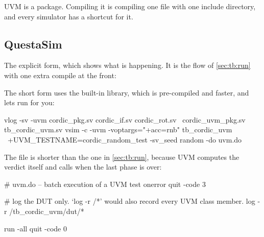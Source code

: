%
UVM is a package. Compiling it is compiling one file with one include
directory, and every simulator has a shortcut for it.

\subsection{QuestaSim}

The explicit form, which shows what is happening. It is the flow of
\cref{sec:tb:run} with one extra compile at the front:


The short form uses the built-in library, which is pre-compiled and faster,
and lets  run  for you:

\begin{shcode}
vlog -sv -uvm cordic_pkg.sv cordic_if.sv cordic_rot.sv \
              cordic_uvm_pkg.sv tb_cordic_uvm.sv
vsim -c -uvm -voptargs="+acc=rnb" tb_cordic_uvm \
     +UVM_TESTNAME=cordic_random_test -sv_seed random -do uvm.do
\end{shcode}

The \code{do} file is shorter than the one in \cref{sec:tb:run}, because UVM
computes the verdict itself and \code{run\_test()} calls  when
the last phase is over:

\begin{tclcode}
# uvm.do -- batch execution of a UVM test
onerror {quit -code 3}

# log the DUT only.  `log -r /*' would also record every UVM class member.
log -r /tb_cordic_uvm/dut/*

run -all
quit -code 0
\end{tclcode}

